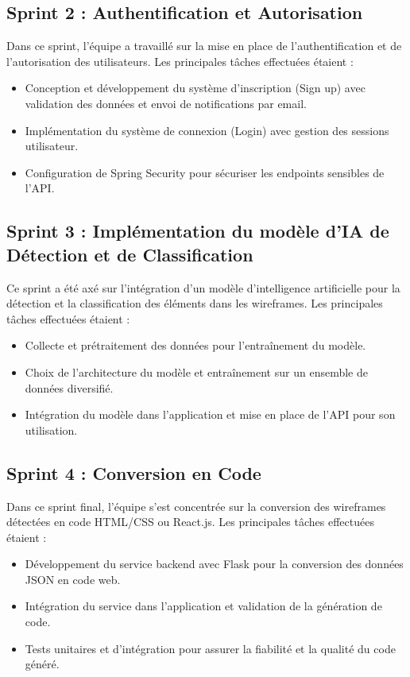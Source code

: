 \subsection{Sprint 2 : Authentification et Autorisation}

Dans ce sprint, l'équipe a travaillé sur la mise en place de l'authentification et de l'autorisation des utilisateurs. Les principales tâches effectuées étaient :

\begin{itemize}
    \item Conception et développement du système d'inscription (Sign up) avec validation des données et envoi de notifications par email.
    \item Implémentation du système de connexion (Login) avec gestion des sessions utilisateur.
    \item Configuration de Spring Security pour sécuriser les endpoints sensibles de l'API.
\end{itemize}

\subsection{Sprint 3 : Implémentation du modèle d'IA de Détection et de Classification}

Ce sprint a été axé sur l'intégration d'un modèle d'intelligence artificielle pour la détection et la classification des éléments dans les wireframes. Les principales tâches effectuées étaient :

\begin{itemize}
    \item Collecte et prétraitement des données pour l'entraînement du modèle.
    \item Choix de l'architecture du modèle et entraînement sur un ensemble de données diversifié.
    \item Intégration du modèle dans l'application et mise en place de l'API pour son utilisation.
\end{itemize}

\subsection{Sprint 4 : Conversion en Code}

Dans ce sprint final, l'équipe s'est concentrée sur la conversion des wireframes détectées en code HTML/CSS ou React.js. Les principales tâches effectuées étaient :

\begin{itemize}
    \item Développement du service backend avec Flask pour la conversion des données JSON en code web.
    \item Intégration du service dans l'application et validation de la génération de code.
    \item Tests unitaires et d'intégration pour assurer la fiabilité et la qualité du code généré.
\end{itemize}

